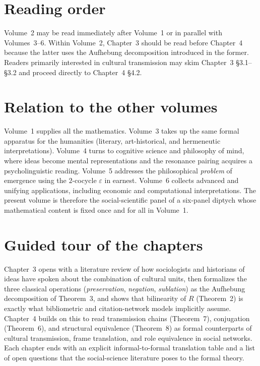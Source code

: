 \documentclass[11pt,oneside]{book}
\begin{document}
\section*{Reading order}
Volume~2 may be read immediately after Volume~1 or in parallel with
Volumes~3--6. Within Volume~2, Chapter~3 should be read before
Chapter~4 because the latter uses the Aufhebung decomposition
introduced in the former. Readers primarily interested in cultural
transmission may skim Chapter~3 §3.1--§3.2 and proceed directly to
Chapter~4 §4.2.

\section*{Relation to the other volumes}
Volume~1 supplies all the mathematics. Volume~3 takes up the same
formal apparatus for the humanities (literary, art-historical, and
hermeneutic interpretations). Volume~4 turns to cognitive science and
philosophy of mind, where ideas become mental representations and the
resonance pairing acquires a psycholinguistic reading. Volume~5
addresses the philosophical \emph{problem} of emergence using the
$2$-cocycle $\varepsilon$ in earnest. Volume~6 collects advanced and
unifying applications, including economic and computational
interpretations. The present volume is therefore the
social-scientific panel of a six-panel diptych whose mathematical
content is fixed once and for all in Volume~1.

\section*{Guided tour of the chapters}
Chapter~3 opens with a literature review of how sociologists and
historians of ideas have spoken about the combination of cultural
units, then formalizes the three classical operations
(\emph{preservation}, \emph{negation}, \emph{sublation}) as the
Aufhebung decomposition of Theorem~3, and shows that bilinearity of
$R$ (Theorem~2) is exactly what bibliometric and citation-network
models implicitly assume. Chapter~4 builds on this to read
transmission chains (Theorem~7), conjugation (Theorem~6), and
structural equivalence (Theorem~8) as formal counterparts of cultural
transmission, frame translation, and role equivalence in social
networks. Each chapter ends with an explicit
informal-to-formal translation table and a list of open questions
that the social-science literature poses to the formal theory.

\mainmatter
\end{document}
